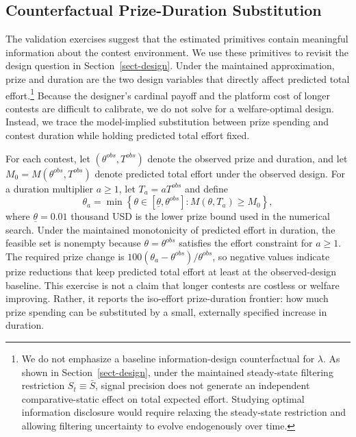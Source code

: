 \documentclass[mnsc]{informs3}
\begin{document}
\subsection{Counterfactual Prize-Duration Substitution}

The validation exercises suggest that the estimated primitives contain
meaningful information about the contest environment. We use these primitives to
revisit the design question in Section~\ref{sect-design}. Under the maintained
approximation, prize and duration are the two design variables that directly
affect predicted total effort.\footnote{
We do not emphasize a baseline information-design counterfactual for
$\lambda$. As shown in Section~\ref{sect-design}, under the maintained
steady-state filtering restriction $S_t\equiv\bar S$, signal precision does not
generate an independent comparative-static effect on total expected effort.
Studying optimal information disclosure would require relaxing the steady-state
restriction and allowing filtering uncertainty to evolve endogenously over time.
}
Because the designer's cardinal payoff and the platform cost of longer contests
are difficult to calibrate, we do not solve for a welfare-optimal design.
Instead, we trace the model-implied substitution between prize spending and
contest duration while holding predicted total effort fixed.

For each contest, let $(\theta^{obs},T^{obs})$ denote the observed prize and
duration, and let
$M_0=M(\theta^{obs},T^{obs})$ denote predicted total effort under the observed
design. For a duration multiplier $a\geq1$, let $T_a=aT^{obs}$ and define
\[
\theta_a
=
\min\left\{
\theta\in[\underline\theta,\theta^{obs}]
:
M(\theta,T_a)\geq M_0
\right\},
\]
where $\underline\theta=0.01$ thousand USD is the lower prize bound used in the numerical search. Under the maintained monotonicity of predicted effort in duration, the feasible set is nonempty because $\theta=\theta^{obs}$ satisfies the effort constraint for $a\geq1$.
The required prize change is
$100(\theta_a-\theta^{obs})/\theta^{obs}$, so negative values indicate prize
reductions that keep predicted total effort at least at the observed-design
baseline. This exercise is not a claim that longer contests are costless or
welfare improving. Rather, it reports the iso-effort prize-duration frontier:
how much prize spending can be substituted by a small, externally specified
increase in duration.
\end{document}
